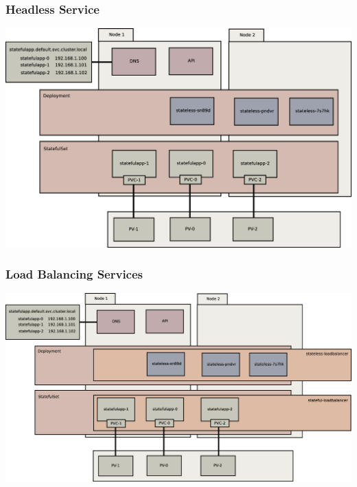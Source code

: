 \documentclass{beamer}
\begin{document}
\begin{frame}
\frametitle{Headless Service}
\includegraphics[width=\textwidth,height=\textheight,keepaspectratio]{graphics/07-persistentIdentity.eps}
\end{frame}

\begin{frame}
\frametitle{Load Balancing Services}
\includegraphics[width=\textwidth,height=\textheight,keepaspectratio]{graphics/08-loadBalancer.eps}
\end{frame}
\end{document}
